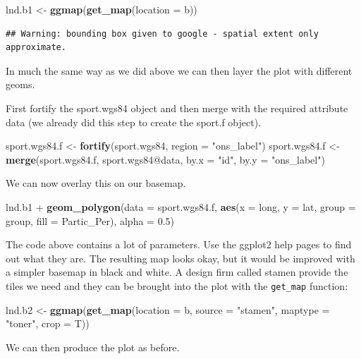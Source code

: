 \documentclass[]{article}
\newenvironment{Shaded}{}{}
\newcommand{\KeywordTok}[1]{\textcolor[rgb]{0.00,0.44,0.13}{\textbf{{#1}}}}
\newcommand{\DataTypeTok}[1]{\textcolor[rgb]{0.56,0.13,0.00}{{#1}}}
\newcommand{\FloatTok}[1]{\textcolor[rgb]{0.25,0.63,0.44}{{#1}}}
\newcommand{\StringTok}[1]{\textcolor[rgb]{0.25,0.44,0.63}{{#1}}}
\newcommand{\NormalTok}[1]{{#1}}
\begin{document}
\begin{Shaded}
\begin{Highlighting}[]
\NormalTok{lnd.b1 <- }\KeywordTok{ggmap}\NormalTok{(}\KeywordTok{get_map}\NormalTok{(}\DataTypeTok{location =} \NormalTok{b))}
\end{Highlighting}
\end{Shaded}
\begin{verbatim}
## Warning: bounding box given to google - spatial extent only approximate.
\end{verbatim}
In much the same way as we did above we can then layer the plot with
different geoms.

First fortify the sport.wgs84 object and then merge with the required
attribute data (we already did this step to create the sport.f object).

\begin{Shaded}
\begin{Highlighting}[]
\NormalTok{sport.wgs84.f <- }\KeywordTok{fortify}\NormalTok{(sport.wgs84, }\DataTypeTok{region =} \StringTok{"ons_label"}\NormalTok{)}
\NormalTok{sport.wgs84.f <- }\KeywordTok{merge}\NormalTok{(sport.wgs84.f, sport.wgs84@data, }\DataTypeTok{by.x =} \StringTok{"id"}\NormalTok{, }\DataTypeTok{by.y =} \StringTok{"ons_label"}\NormalTok{)}
\end{Highlighting}
\end{Shaded}
We can now overlay this on our basemap.

\begin{Shaded}
\begin{Highlighting}[]
\NormalTok{lnd.b1 + }\KeywordTok{geom_polygon}\NormalTok{(}\DataTypeTok{data =} \NormalTok{sport.wgs84.f, }\KeywordTok{aes}\NormalTok{(}\DataTypeTok{x =} \NormalTok{long, }\DataTypeTok{y =} \NormalTok{lat, }\DataTypeTok{group =} \NormalTok{group, }
    \DataTypeTok{fill =} \NormalTok{Partic_Per), }\DataTypeTok{alpha =} \FloatTok{0.5}\NormalTok{)}
\end{Highlighting}
\end{Shaded}
The code above contains a lot of parameters. Use the ggplot2 help pages
to find out what they are. The resulting map looks okay, but it would be
improved with a simpler basemap in black and white. A design firm called
stamen provide the tiles we need and they can be brought into the plot
with the \texttt{get\_map} function:

\begin{Shaded}
\begin{Highlighting}[]
\NormalTok{lnd.b2 <- }\KeywordTok{ggmap}\NormalTok{(}\KeywordTok{get_map}\NormalTok{(}\DataTypeTok{location =} \NormalTok{b, }\DataTypeTok{source =} \StringTok{"stamen"}\NormalTok{, }\DataTypeTok{maptype =} \StringTok{"toner"}\NormalTok{, }
    \DataTypeTok{crop =} \NormalTok{T))}
\end{Highlighting}
\end{Shaded}
We can then produce the plot as before.
\end{document}
